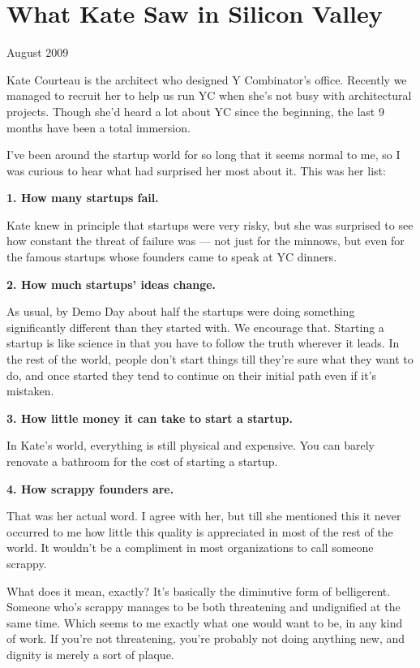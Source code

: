 \documentclass[12pt]{book}
\begin{document}
\chapter{What Kate Saw in Silicon Valley  }

August 2009

Kate Courteau is the architect who designed Y Combinator's office.
Recently we managed to recruit her to help us run YC when she's not busy
with architectural projects. Though she'd heard a lot about YC since the
beginning, the last 9 months have been a total immersion.

I've been around the startup world for so long that it seems normal to
me, so I was curious to hear what had surprised her most about it. This
was her list:

\textbf{1. How many startups fail.}

Kate knew in principle that startups were very risky, but she was
surprised to see how constant the threat of failure was --- not just for
the minnows, but even for the famous startups whose founders came to
speak at YC dinners.

\textbf{2. How much startups' ideas change.}

As usual, by Demo Day about half the startups were doing something
significantly different than they started with. We encourage that.
Starting a startup is like science in that you have to follow the truth
wherever it leads. In the rest of the world, people don't start things
till they're sure what they want to do, and once started they tend to
continue on their initial path even if it's mistaken.

\textbf{3. How little money it can take to start a startup.}

In Kate's world, everything is still physical and expensive. You can
barely renovate a bathroom for the cost of starting a startup.

\textbf{4. How scrappy founders are.}

That was her actual word. I agree with her, but till she mentioned this
it never occurred to me how little this quality is appreciated in most
of the rest of the world. It wouldn't be a compliment in most
organizations to call someone scrappy.

What does it mean, exactly? It's basically the diminutive form of
belligerent. Someone who's scrappy manages to be both threatening and
undignified at the same time. Which seems to me exactly what one would
want to be, in any kind of work. If you're not threatening, you're
probably not doing anything new, and dignity is merely a sort of plaque.
\end{document}
